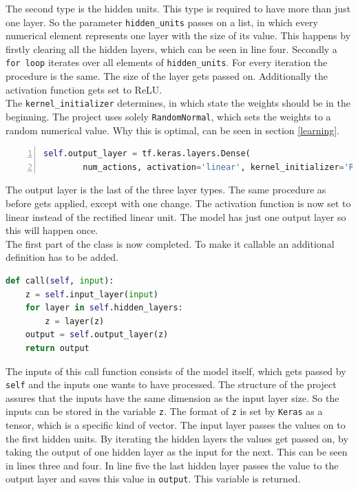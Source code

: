 \documentclass[12pt]{article}
\begin{document}
The second type is the \gls{hidden units}. This type is required to have more than just one layer. So the parameter \lstinline{hidden_units} passes on a list, in which every numerical element represents one layer with the size of its value. This happens by firstly clearing all the \glspl{hidden layer}, which can be seen in line four. Secondly a \lstinline{for loop} iterates over all elements of \lstinline{hidden_units}. For every \gls{iteration} the procedure is the same. The size of the layer gets passed on. Additionally the \gls{activation function} gets set to ReLU.\\
The \lstinline{kernel_initializer} determines, in which \gls{state} the \glspl{weight} should be in the beginning. The project uses solely \lstinline{RandomNormal}, which sets the \glspl{weight} to a random numerical value. Why this is optimal, can be seen in section \ref{learning}.
\lstset{ numbers=left, stepnumber=1,      firstnumber=8,  numberfirstline=true}
\begin{lstlisting}[language=Python,numbers=left]
    self.output_layer = tf.keras.layers.Dense(
        num_actions, activation='linear', kernel_initializer='RandomNormal')
\end{lstlisting}
The \gls{output layer} is the last of the three layer types. The same procedure as before gets applied, except with one change. The \gls{activation function} is now set to linear instead of the rectified linear unit. The model has just one \gls{output layer} so this will happen once.
\lstset{ numbers=left, stepnumber=1,firstnumber=1,  numberfirstline=true}
\\ The first part of the class is now completed. To make it callable an additional definition has to be added.
\begin{lstlisting}[language=Python, caption = Example - Making the model callable]
def call(self, input):
    z = self.input_layer(input) 
    for layer in self.hidden_layers: 
        z = layer(z) 
    output = self.output_layer(z) 
    return output
\end{lstlisting}
The \glspl{input} of this call function consists of the model itself, which gets passed by \lstinline{self} and the  \glspl{input} one wants to have processed. The structure of the project assures that the  \glspl{input} have the same dimension as the \gls{input layer} size. So the  \glspl{input} can be stored in the variable \lstinline{z}. The format of \lstinline{z} is set by \lstinline{Keras} as a \gls{tensor}, which is a specific kind of \gls{vector}. The \gls{input layer} passes the values on to the first \gls{hidden units}. By iterating the \glspl{hidden layer} the values get passed on, by taking the \gls{output} of one hidden layer as the \gls{input} for the next. This can be seen in lines three and four. In line five the last hidden layer passes the value to the  \gls{output layer} and saves this value in \lstinline{output}. This variable is returned.
\end{document}
